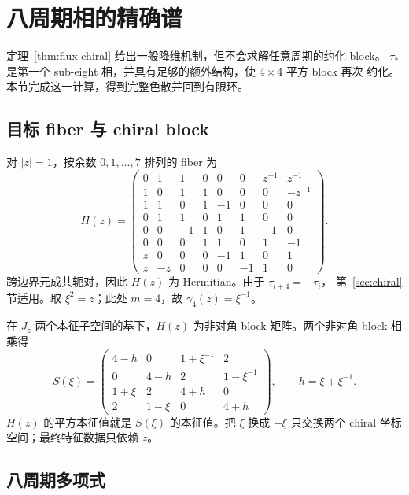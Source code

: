 \section{八周期相的精确谱}
\label{sec:period8}

定理~\ref{thm:flux-chiral} 给出一般降维机制，但不会求解任意周期的约化 block。
$\tau_*$ 是第一个 sub-eight 相，并具有足够的额外结构，使 $4\times4$ 平方 block 再次
约化。本节完成这一计算，得到完整色散并回到有限环。

\subsection{目标 fiber 与 chiral block}

对 $|z|=1$，按余数 $0,1,\ldots,7$ 排列的 fiber 为
\begin{equation}
 H(z)=\begin{pmatrix}
0&1&1&0&0&0&z^{-1}&z^{-1}\\
1&0&1&1&0&0&0&-z^{-1}\\
1&1&0&1&-1&0&0&0\\
0&1&1&0&1&1&0&0\\
0&0&-1&1&0&1&-1&0\\
0&0&0&1&1&0&1&-1\\
z&0&0&0&-1&1&0&1\\
z&-z&0&0&0&-1&1&0
\end{pmatrix}.
\label{eq:period8-fiber}
\end{equation}
跨边界元成共轭对，因此 $H(z)$ 为 Hermitian。由于 $\tau_{i+4}=-\tau_i$，
第~\ref{sec:chiral} 节适用。取 $\xi^2=z$；此处 $m=4$，故
$\gamma_4(z)=\xi^{-1}$。

在 $J_z$ 两个本征子空间的基下，$H(z)$ 为非对角 block 矩阵。两个非对角 block 相乘得
\begin{equation}
 S(\xi)=\begin{pmatrix}
4-h&0&1+\xi^{-1}&2\\
0&4-h&2&1-\xi^{-1}\\
1+\xi&2&4+h&0\\
2&1-\xi&0&4+h
\end{pmatrix},\qquad h=\xi+\xi^{-1}.
\label{eq:period8-squared-block}
\end{equation}
$H(z)$ 的平方本征值就是 $S(\xi)$ 的本征值。把 $\xi$ 换成 $-\xi$ 只交换两个 chiral
坐标空间；最终特征数据只依赖 $z$。

\subsection{八周期多项式}

